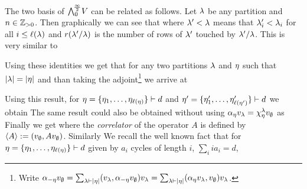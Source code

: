 \documentclass[../main/main.tex]{subfiles}
\begin{document}
The two basis of $\bigwedge^{\!\frac\infty2}_0\!V$ can be related as follows. Let $\lambda$ be any partition and $n\in\mathbb Z_{>0}$. Then graphically we can see that 
where $\lambda'<\lambda$ means that $\lambda'_i<\lambda_i$ for all $i\leq\ell(\lambda)$ and $r(\lambda'/\lambda)$ is the number of rows of $\lambda'$ touched by $\lambda'/\lambda$. This is very similar to
\begin{lemma}
\end{lemma}
Using these identities we get that for any two partitions $\lambda$ and $\eta$ such that $|\lambda|=|\eta|$ 
and than taking the adjoint\footnote{Write $\alpha_{-\eta}v_\emptyset=\sum_{\lambda\vdash|\eta|}(v_\lambda,\alpha_{-\eta}v_\emptyset)v_\lambda=\sum_{\lambda\vdash|\eta|}(\alpha_\eta v_\lambda,v_\emptyset)v_\lambda$.} we arrive at

Using this result, for $\eta=\{\eta_1,\ldots,\eta_{\ell(\eta)}\}\vdash d$ and $\eta'=\{\eta'_1,\ldots,\eta'_{\ell(\eta')}\}\vdash d$ we obtain
The same result could also be obtained  without using $\alpha_{\eta} v_\lambda=\chi_\eta^\lambda v_\emptyset$ as
Finally we get
where the \emph{correlator} of the operator $A$ is defined by $\langle A\rangle:=(v_\emptyset,Av_\emptyset)$. Similarly
We recall the well known fact that for $\eta=\{\eta_1,\ldots,\eta_{\ell(\eta)}\}\vdash d$ given by $a_i$ cycles of length $i$, $\sum_i ia_i=d$,
\end{document}
